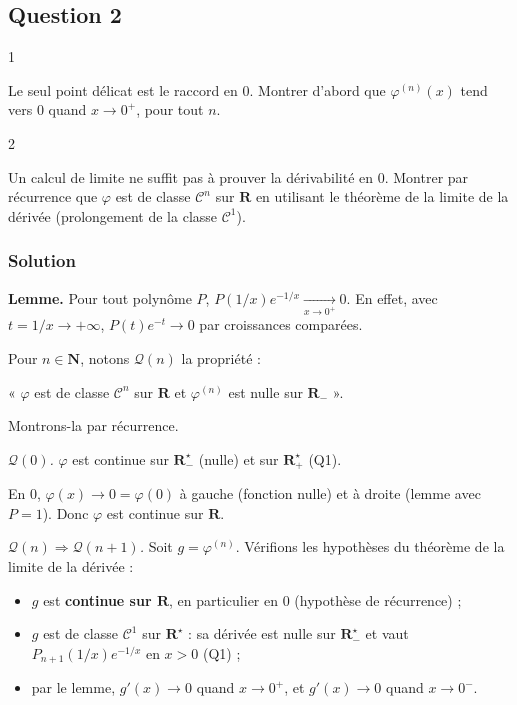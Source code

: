 \documentclass[11pt,a4paper]{article}
\providecommand{\tightlist}{\setlength{\itemsep}{0pt}\setlength{\parskip}{0pt}}
\begin{document}
\hypertarget{question-2}{%
\subsection{Question 2}\label{question-2}}

\begin{indication}{1}

Le seul point délicat est le raccord en \(0\). Montrer d'abord que \(\varphi^{(n)}(x)\) tend vers \(0\) quand \(x\to0^+\), pour tout \(n\).

\end{indication}

\begin{indication}{2}

Un calcul de limite ne suffit pas à prouver la dérivabilité en \(0\). Montrer par récurrence que \(\varphi\) est de classe \(\mathcal C^n\) sur \(\mathbf R\) en utilisant le théorème de la limite de la dérivée (prolongement de la classe \(\mathcal C^1\)).

\end{indication}

\hypertarget{solution-1}{%
\subsubsection{Solution}\label{solution-1}}

\textbf{Lemme.} Pour tout polynôme \(P\), \(P(1/x)e^{-1/x}\xrightarrow[x\to0^+]{}0\). En effet, avec \(t=1/x\to+\infty\), \(P(t)e^{-t}\to0\) par croissances comparées.

Pour \(n\in\mathbf N\), notons \(\mathcal Q(n)\) la propriété :

« \(\varphi\) est de classe \(\mathcal C^n\) sur \(\mathbf R\) et \(\varphi^{(n)}\) est nulle sur \(\mathbf R_-\) ».

Montrons-la par récurrence.

\emph{\(\mathcal Q(0)\).} \(\varphi\) est continue sur \(\mathbf R_-^\star\) (nulle) et sur \(\mathbf R_+^\star\) (Q1).

En \(0\), \(\varphi(x)\to0=\varphi(0)\) à gauche (fonction nulle) et à droite (lemme avec \(P=1\)). Donc \(\varphi\) est continue sur \(\mathbf R\).

\emph{\(\mathcal Q(n)\Rightarrow\mathcal Q(n+1)\).} Soit \(g=\varphi^{(n)}\). Vérifions les hypothèses du théorème de la limite de la dérivée :

\begin{itemize}
\tightlist
\item
  \(g\) est \textbf{continue sur \(\mathbf R\)}, en particulier en \(0\) (hypothèse de récurrence) ;
\item
  \(g\) est de classe \(\mathcal C^1\) sur \(\mathbf R^\star\) : sa dérivée est nulle sur \(\mathbf R_-^\star\) et vaut \(P_{n+1}(1/x)e^{-1/x}\) en \(x>0\) (Q1) ;
\item
  par le lemme, \(g'(x)\to0\) quand \(x\to0^+\), et \(g'(x)\to0\) quand \(x\to0^-\).
\end{itemize}
\end{document}
